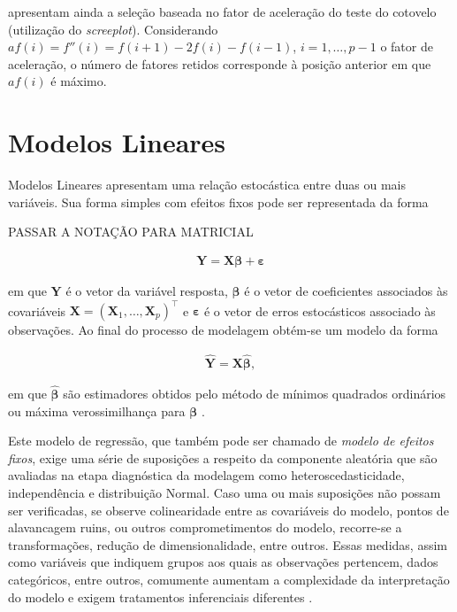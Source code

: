 \documentclass[12pt, a4paper, twoside]{report}
\numberwithin{equation}{subsection} %
\begin{document}
\cite{morettindatasci} apresentam ainda a seleção baseada no fator de aceleração do teste do cotovelo (utilização do \textit{screeplot}). Considerando $af(i) = f''(i) = f(i+1) - 2f(i) - f(i-1)$, $i = 1, \dots, p-1$ o fator de aceleração, o número de fatores retidos corresponde à posição anterior em que $af(i)$ é máximo.



\section{Modelos Lineares}

Modelos Lineares apresentam uma relação estocástica entre duas ou mais variáveis. Sua forma simples com efeitos fixos pode ser representada da forma

PASSAR A NOTAÇÃO PARA MATRICIAL

\begin{align}
	\boldsymbol{Y} = \boldsymbol{X \beta + \varepsilon} \label{relacao_linear_basica}
\end{align}

\noindent em que $\boldsymbol{Y}$ é o vetor da variável resposta, $\boldsymbol{\beta}$ é o vetor de coeficientes associados às covariáveis $\boldsymbol{X} = \left( \boldsymbol{X}_1, \dots, \boldsymbol{X}_p \right)^\top$ e $\boldsymbol{\varepsilon}$ é o vetor de erros estocásticos associado às observações. Ao final do processo de modelagem obtém-se um modelo da forma


\begin{align}
	\hat{\boldsymbol{Y}} = \boldsymbol{X \hat{\beta}}, \label{modelo_linear_basico}
\end{align}

\noindent em que $\hat{\boldsymbol{\beta}}$ são estimadores obtidos pelo método de mínimos quadrados ordinários ou máxima verossimilhança para $\boldsymbol{\beta}$ \citep{kutner2005applied}.

Este modelo de regressão, que também pode ser chamado de \textit{modelo de efeitos fixos}, exige uma série de suposições a respeito da componente aleatória que são avaliadas na etapa diagnóstica da modelagem como heteroscedasticidade, independência e distribuição Normal. Caso uma ou mais suposições não possam ser verificadas, se observe colinearidade entre as covariáveis do modelo, pontos de alavancagem ruins, ou outros comprometimentos do modelo, recorre-se a  transformações, redução de dimensionalidade, entre outros. Essas medidas, assim como variáveis que indiquem grupos aos quais as observações pertencem, dados categóricos, entre outros, comumente aumentam a complexidade da interpretação do modelo e exigem tratamentos inferenciais diferentes \citep{hox2017multilevel}.
\end{document}
